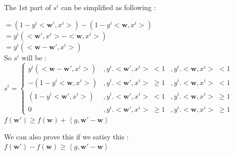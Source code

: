 \documentclass[a4paper,11pt]{article}
\begin{document}
\begin{mlsolution}
The 1st part of \begin{math}s^{i}\end{math} can be simplified as following :

\begin{math}
=\left ( 1 - y^{i}<\textbf{w}{}', x^{i}>  \right ) - \left ( 1 - y^{i}<\textbf{w}, x^{i}> \right )\end{math}\\

\begin{math}= y^{i} \left (  <\textbf{w}{}', x^{i}> - <\textbf{w}, x^{i}>\right )\end{math}\\

\begin{math}= y^{i} \left (<\textbf{w} -\textbf{w}{}', x^{i}>\right )\end{math}\\

So \begin{math}s^{i}\end{math} will be :\\

\begin{math}
s^{i} = \left\{\begin{matrix}
y^{i} \left (<\textbf{w} -\textbf{w}{}', x^{i}>\right ) & ,y^{i}.<\textbf{w}{}', x^{i}> \; <  1&,  y^{i}.<\textbf{w}, x^{i}> \;< 1\\ 
- \left ( 1 - y^{i}<\textbf{w}, x^{i}> \right ) & ,y^{i}.<\textbf{w}{}', x^{i}> \; \geq  1 & ,  y^{i}.<\textbf{w}, x^{i}> \;< 1\\ 
\left ( 1 - y^{i}<\textbf{w}{}', x^{i}>  \right ) & ,y^{i}.<\textbf{w}{}', x^{i}> \; <  1 & ,  y^{i}.<\textbf{w}, x^{i}> \; \geq 1\\ 
0 & ,y^{i}.<\textbf{w}{}', x^{i}> \; \geq  1 & ,  y^{i}.<\textbf{w}, x^{i}> \; \geq 1
\end{matrix}\right.
\end{math}\\

\begin{math}
f\left ( \textbf{w}{}' \right ) \geq f\left ( \textbf{w} \right ) + \left \langle g, \textbf{w}{}' - \textbf{w} \right \rangle
\end{math}

We can also prove this if we satisy this : \\

\begin{math}
f\left ( \textbf{w}{}' \right ) - f\left ( \textbf{w} \right ) \geq  \left \langle g, \textbf{w}{}' - \textbf{w} \right \rangle
\end{math}


\end{mlsolution}
\end{document}
